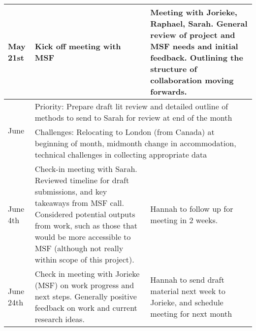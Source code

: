 \begin{singlespace}
\begin{longtable}{|p{2cm}|p{5cm}|p{5cm}}
May 21st                & Kick off meeting with MSF                                                                                                                                                                                                                             & Meeting with Jorieke, Raphael, Sarah. General review of project and MSF needs and initial feedback. Outlining the structure of collaboration moving forwards.                                                               \\ 
\hline
\multirow{2}{*}{June}   & \multicolumn{2}{p{8cm}}{Priority: Prepare draft lit review and detailed outline of methods to send to Sarah for review at end of the month}                                                                                                                                                                                                                                                                                                                                              \\
                        & \multicolumn{2}{p{8cm}}{Challenges: Relocating to London (from Canada) at beginning of month, midmonth change in accommodation, technical challenges in collecting appropriate data}                                                                                                                                                                                                                                                                                                     \\ 
\hline
June 4th                & Check-in meeting with Sarah. Reviewed timeline for draft submissions, and key takeaways from MSF call. Considered potential outputs from work, such as those that would be more accessible to MSF (although not really within scope of this project). & Hannah to follow up for meeting in 2 weeks.                                                                                                                                                                                 \\
June 24th               & Check in meeting with Jorieke (MSF) on work progress and next steps. Generally positive feedback on work and current research ideas.                                                                                                                  & Hannah to send draft material next week to Jorieke, and schedule meeting for next month                                                                                                                                     \\

\end{longtable}
\end{singlespace}
